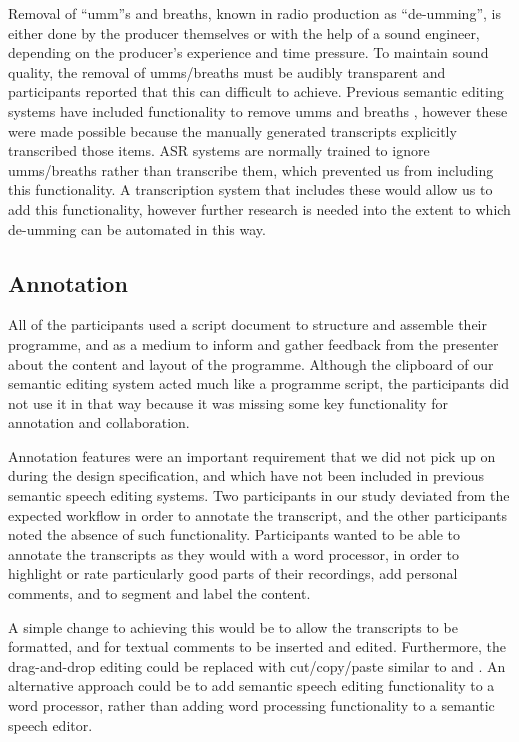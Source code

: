 Removal of ``umm''s and breaths, known in radio production as ``de-umming'', is either done by the producer themselves or
with the help of a sound engineer, depending on the producer's experience and time pressure. To maintain sound quality,
the removal of umms/breaths must be audibly transparent and participants reported that this can difficult to achieve.
Previous semantic editing systems have included functionality to remove umms \citep{Berthouzoz2012} and breaths
\citep{Rubin2013}, however these were made possible because the manually generated transcripts 
explicitly transcribed those items. ASR systems are normally trained to ignore umms/breaths rather than
transcribe them, which prevented us from including this functionality. A transcription system that includes these would
allow us to add this functionality, however further research is needed into the extent to which de-umming can be
automated in this way.

\subsection{Annotation}

All of the participants used a script document to structure and assemble their programme, and as a
medium to inform and gather feedback from the presenter about the content and layout of the programme. Although the
clipboard of our semantic editing system acted much like a programme script, the participants did not use it in that
way because it was missing some key functionality for annotation and collaboration.

Annotation features were an important requirement that we did not pick up on during the design specification, and which
have not been included in previous semantic speech editing systems. Two participants in our study deviated from the
expected workflow in order to annotate the transcript, and the other participants noted the absence of such
functionality. Participants wanted to be able to annotate the transcripts as they would with a word processor, in order
to highlight or rate particularly good parts of their recordings, add personal comments, and to segment and label the
content.

A simple change to achieving this would be to allow the transcripts to be formatted, and for textual comments to be
inserted and edited. Furthermore, the drag-and-drop editing could be replaced with cut/copy/paste similar to
\citet{Whittaker2004} and \citet{Rubin2013}. An alternative approach could be to add semantic speech editing
functionality to a word processor, rather than adding word processing functionality to a semantic speech editor.

